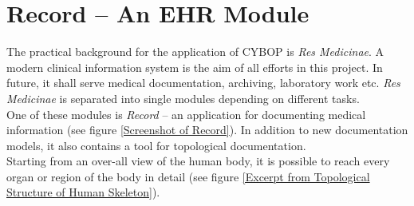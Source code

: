 \section{Record -- An EHR Module}
The practical background for the application of CYBOP is \emph{Res Medicinae}.
A modern clinical information system is the aim of all efforts in this project.
In future, it shall serve medical documentation, archiving, laboratory work etc.
\emph{Res Medicinae} is separated into single modules depending on different tasks.\\
One of these modules is \emph{Record} -- an application for
documenting medical information (see figure \ref{Screenshot of
Record}). In addition to new documentation models,
it also contains a tool for topological documentation.\\
Starting from an over-all view of the human body, it is possible
to reach every organ or region of the body in detail (see figure
\ref{Excerpt from Topological Structure of Human Skeleton}).
